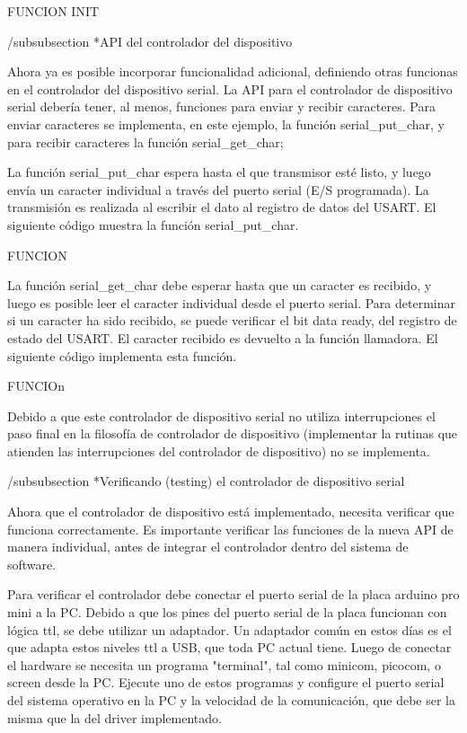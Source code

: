 \documentclass[12pt]{article}
\begin{document}
FUNCION INIT


/subsubsection *{API del controlador del dispositivo}


Ahora ya es posible incorporar funcionalidad adicional, definiendo otras
funcionas en el controlador del dispositivo serial.
La API para el controlador de dispositivo serial debería tener, al menos,
funciones para enviar y recibir caracteres. Para enviar caracteres
se implementa, en este ejemplo, la función serial\_put\_char, y para recibir
caracteres la función serial\_get\_char;


La función serial\_put\_char espera hasta el que transmisor esté listo, y 
luego envía un caracter individual a través del puerto serial (E/S programada).
La
transmisión es realizada al escribir el dato al registro de datos del USART.
El siguiente código muestra la función serial\_put\_char.

FUNCION 


La función serial\_get\_char debe esperar hasta que un caracter es recibido, y 
luego es posible leer el caracter individual desde el puerto serial. 
Para determinar si un caracter ha sido recibido, se puede verificar
el bit data ready, del registro de estado del USART. El caracter
recibido es devuelto a la función llamadora. 
El siguiente código implementa esta función.

FUNCIOn

Debido a que este controlador de dispositivo serial no utiliza interrupciones
el paso final en la filosofía de controlador de dispositivo (implementar
la rutinas que atienden las interrupciones del controlador de dispositivo)
no se implementa.


/subsubsection *{Verificando (testing) el controlador de dispositivo serial}

Ahora que el controlador de dispositivo está implementado, necesita verificar
que funciona correctamente. Es importante verificar las funciones de la nueva
API de manera individual, 
antes de integrar el controlador dentro del sistema de software.

Para verificar el controlador debe conectar el puerto serial de la placa
arduino pro mini a la PC. Debido a que los pines del puerto serial de la placa
funcionan con lógica ttl, se debe utilizar un adaptador. Un adaptador
común en estos días es el que adapta estos niveles ttl a USB, que toda PC
actual tiene.
Luego de conectar el hardware se necesita un programa "terminal", tal
como minicom, picocom, o screen desde la PC. Ejecute uno de estos programas
y configure el puerto serial del sistema operativo en la PC y la
velocidad de la comunicación, que debe ser la misma que la del driver 
implementado.
\end{document}
